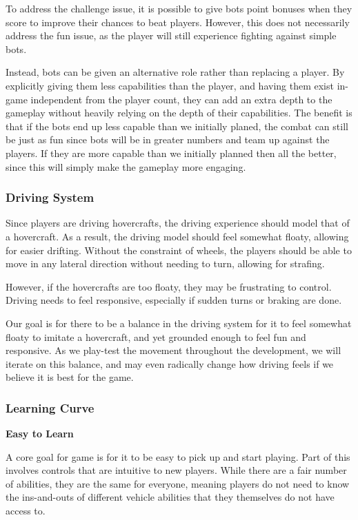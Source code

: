 \documentclass{article}
\theoremstyle{definition}
\begin{document}
To address the challenge issue, it is possible to give bots point bonuses when
they score to improve their chances to beat players. However, this does not
necessarily address the fun issue, as the player will still experience fighting
against simple bots.

Instead, bots can be given an alternative role rather than replacing a player.
By explicitly giving them less capabilities than the player, and having them
exist in-game independent from the player count, they can add an extra depth to
the gameplay without heavily relying on the depth of their capabilities. The
benefit is that if the bots end up less capable than we initially planed, the
combat can still be just as fun since bots will be in greater numbers and team
up against the players. If they are more capable than we initially planned then
all the better, since this will simply make the gameplay more engaging.

\subsubsection{Driving System}

Since players are driving hovercrafts, the driving experience should model
that of a hovercraft. As a result, the driving model should feel somewhat
floaty, allowing for easier drifting. Without the constraint of wheels, the
players should be able to move in any lateral direction without needing to
turn, allowing for strafing.

However, if the hovercrafts are too floaty, they may be frustrating to control.
Driving needs to feel responsive, especially if sudden turns or braking are
done.

Our goal is for there to be a balance in the driving system for it to feel
somewhat floaty to imitate a hovercraft, and yet grounded enough to feel fun
and responsive. As we play-test the movement throughout the development, we
will iterate on this balance, and may even radically change how driving feels
if we believe it is best for the game.

\subsubsection{Learning Curve}

\textbf{Easy to Learn}

A core goal for game is for it to be easy to pick up and start playing.
Part of this involves controls that are intuitive to new players. While there
are a fair number of abilities, they are the same for everyone, meaning players
do not need to know the ins-and-outs of different vehicle abilities that they
themselves do not have access to.
\end{document}
